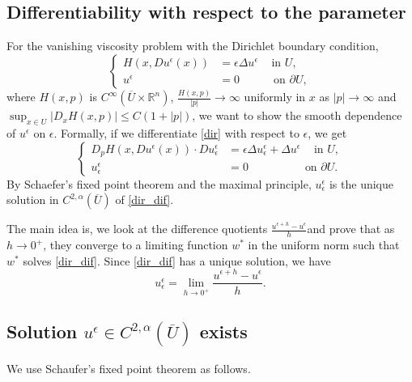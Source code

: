 \documentclass[11pt,reqno]{amsart}
\numberwithin{figure}{section}
\theoremstyle{plain}
\theoremstyle{remark}
\numberwithin{equation}{section}
\begin{document}
\begin{appendices}
\section{Differentiability with respect to the parameter}
\noindent For the vanishing viscosity problem with the Dirichlet boundary condition,
\begin{equation}
\label{dir}
\left\{
  \begin{aligned}
    H(x, Du^\epsilon(x)) &= \epsilon \Delta u^\epsilon \quad \, \text{in } U, \\
              u^\epsilon &= 0 \quad \qquad \text{on } \partial U,
  \end{aligned}
\right.
\end{equation}
where  $H(x,p)$ is $C^\infty(\overline{U}\times \mathbb{R}^n)$, $\displaystyle \frac{H(x,p)}{|p|} \to \infty$ uniformly in $x$ as $|p| \to \infty$ and $\displaystyle \sup_{x\in U}|D_xH(x,p)|\leq C(1+|p|)$, we want to show the smooth dependence of $u^\epsilon$ on $\epsilon$.
Formally, if we differentiate \eqref{dir} with respect to $\epsilon$, we get
\begin{equation}
\label{dir_dif}
\left\{
  \begin{aligned}
    D_pH(x, Du^\epsilon(x))\cdot Du^\epsilon_\epsilon &= \epsilon \Delta u^\epsilon_\epsilon +\Delta u^\epsilon \quad \, \text{in } U, \\
              u^\epsilon_\epsilon &= 0 \quad \qquad  \qquad  \text{on } \partial U.
  \end{aligned}
\right.
\end{equation}
By Schaefer's fixed point theorem and the maximal principle, $u^\epsilon_\epsilon$ is the unique solution in $C^{2,\alpha}(\overline{U})$ of \eqref{dir_dif}. 

\noindent The main idea is, we look at the difference quotients $\displaystyle \frac{u^{\epsilon+h}-u^\epsilon}{h}$and prove that as $h \to 0^+$, they converge to a limiting function $w^{\ast}$ in the uniform norm  such that $w^{\ast}$ solves \eqref{dir_dif}. Since \eqref{dir_dif} has a unique solution, we have $$u^\epsilon_\epsilon=\lim_{h \to 0^+}\frac{u^{\epsilon+h}-u^\epsilon}{h}.$$

\subsection{Solution $u^\epsilon \in C^{2,\alpha}(\overline{U})$ exists} We use Schaufer's fixed point theorem as follows.


\end{appendices}
\end{document}
